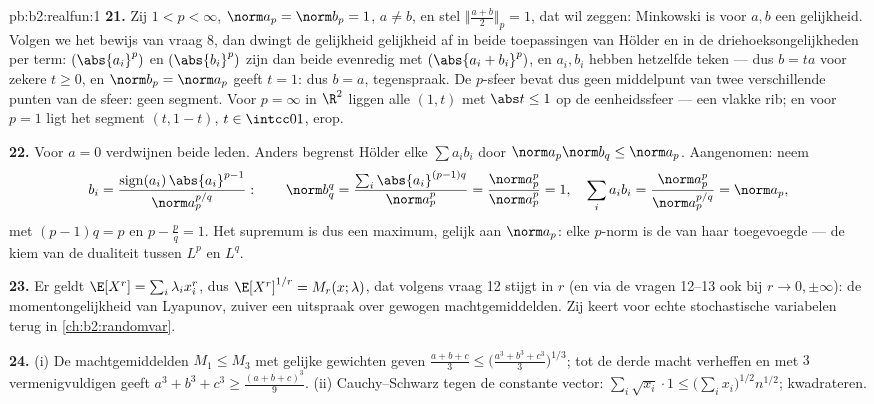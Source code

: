\begin{solution}{pb:b2:realfun:1}
\textbf{21.} Zij $1 < p < \infty$, $\norm a_p = \norm b_p = 1$, $a
\neq b$, en stel $\bigl\Vert\frac{a+b}2\bigr\Vert_p = 1$, dat wil
zeggen: Minkowski is voor $a, b$ een gelijkheid. Volgen we het
bewijs van vraag 8, dan dwingt de gelijkheid gelijkheid af in beide
toepassingen van Hölder en in de driehoeksongelijkheden per term:
$(\abs{a_i}^p)$ en $(\abs{b_i}^p)$ zijn dan beide evenredig met
$(\abs{a_i + b_i}^p)$, en $a_i, b_i$ hebben hetzelfde teken ---
dus $b = ta$ voor zekere $t \geq 0$, en $\norm b_p = \norm a_p$
geeft $t = 1$: dus $b = a$, tegenspraak. De $p$-sfeer bevat dus
geen middelpunt van twee verschillende punten van de sfeer: geen
segment. Voor $p = \infty$ in $\R^2$ liggen alle $(1, t)$ met
$\abs t \leq 1$ op de eenheidssfeer --- een vlakke rib; en voor $p
= 1$ ligt het segment $(t, 1 - t)$, $t \in \intcc01$, erop.

\textbf{22.} Voor $a = 0$ verdwijnen beide leden. Anders begrenst
Hölder elke $\sum a_ib_i$ door $\norm a_p\norm b_q \leq \norm
a_p$. Aangenomen: neem
\[
b_i = \frac{\operatorname{sign}(a_i)\,\abs{a_i}^{p-1}}
{\norm a_p^{p/q}} :
\qquad
\norm b_q^q = \frac{\sum_i\abs{a_i}^{(p-1)q}}{\norm a_p^{p}}
= \frac{\norm a_p^p}{\norm a_p^p} = 1,
\quad
\sum_ia_ib_i = \frac{\norm a_p^p}{\norm a_p^{p/q}} =
\norm a_p ,
\]
met $(p-1)q = p$ en $p - \frac pq = 1$. Het supremum is dus een
maximum, gelijk aan $\norm a_p$: elke $p$-norm is de   van
haar toegevoegde --- de kiem van de dualiteit tussen $L^p$ en
$L^q$.

\textbf{23.} Er geldt $\E[X^r] = \sum_i\lambda_ix_i^r$, dus
$\E[X^r]^{1/r} = M_r(x; \lambda)$, dat volgens vraag 12 stijgt in
$r$ (en via de vragen 12--13 ook bij $r \to 0, \pm\infty$): de
momentongelijkheid van Lyapunov, zuiver een uitspraak over gewogen
machtgemiddelden. Zij keert voor echte stochastische variabelen
terug in \cref{ch:b2:randomvar}.

\textbf{24.} (i) De machtgemiddelden $M_1 \leq M_3$ met gelijke
gewichten geven $\frac{a+b+c}3 \leq
\bigl(\frac{a^3+b^3+c^3}3\bigr)^{1/3}$; tot de derde macht
verheffen en met $3$ vermenigvuldigen geeft $a^3 + b^3 + c^3 \geq
\frac{(a+b+c)^3}9$. (ii) Cauchy--Schwarz tegen de constante
vector: $\sum_i\sqrt{x_i}\cdot1 \leq
\bigl(\sum_ix_i\bigr)^{1/2}n^{1/2}$; kwadrateren.


\end{solution}
